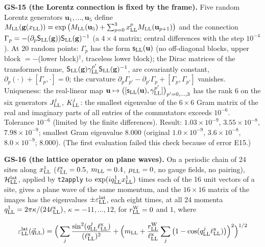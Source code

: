 \documentclass[
  10pt,
]{article}
\begin{document}
\textbf{GS-15 (the Lorentz connection is fixed by the frame).} Five
random Lorentz generators \(\mathbf u_1,\dots,\mathbf u_5\) define
\(M_{\rm LL}(\mathbf g(x_{\rm LL}))=\exp\big(M_{\rm LL}(\mathbf u_5)+\sum_{p=0}^3x^p_{\rm LL}M_{\rm LL}(\mathbf u_{p+1})\big)\)
and the connection
\(\Gamma_p=-(\partial_p\mathsf S_{\rm LL}(\mathbf g))\mathsf S_{\rm LL}(\mathbf g)^{-1}\)
(a \(4\times4\) matrix; central differences with the step \(10^{-4}\)).
At 20 random points: \(\Gamma_p\) has the form
\(\mathsf s_{\rm LL}(\mathbf u)\) (no off-diagonal blocks, upper block
\(=-\)(lower block)\(^\dagger\), traceless lower block); the Dirac
matrices of the transformed frame,
\(\mathsf S_{\rm LL}(\mathbf g)\gamma^{p'}_{\rm LL}\mathsf S_{\rm LL}(\mathbf g)^{-1}\),
are covariantly constant, \(\partial_p(\cdot)+[\Gamma_p,\cdot]=0\); the
curvature
\(\partial_p\Gamma_{p'}-\partial_{p'}\Gamma_p+[\Gamma_p,\Gamma_{p'}]\)
vanishes. Uniqueness: the real-linear map
\(\mathbf u\mapsto\big([\mathsf s_{\rm LL}(\mathbf u),\gamma^{p'}_{\rm LL}]\big)_{p'=0,\dots,3}\)
has the rank 6 on the six generators \(J^j_{\rm LL}\), \(K^j_{\rm LL}\):
the smallest eigenvalue of the \(6\times6\) Gram matrix of the real and
imaginary parts of all entries of the commutators exceeds \(10^{-6}\).
Tolerance \(10^{-6}\) (limited by the finite differences). Result:
\(1.03\times10^{-9}\), \(3.55\times10^{-8}\), \(7.98\times10^{-9}\);
smallest Gram eigenvalue 8.000 (original \(1.0\times10^{-9}\),
\(3.6\times10^{-8}\), \(8.0\times10^{-9}\); 8.000). (The first
evaluation failed this check because of error E15.)

\textbf{GS-16 (the lattice operator on plane waves).} On a periodic
chain of 24 sites along \(x^1_{\rm LL}\) (\(\ell^{\rm x}_{\rm LL}=0.5\),
\(m_{\rm LL}=0.4\), \(\mu_{\rm LL}=0\), no gauge fields, no pairing),
\(\mathcal H^{\rm lat}_{\rm LL}\), applied by \texttt{t2apply} to
\(\exp(iq^1_{\rm LL}x^1_{\rm LL})\) times each of the 16 unit vectors of
a site, gives a plane wave of the same momentum, and the \(16\times16\)
matrix of the images has the eigenvalues
\(\pm\varepsilon^{\rm lat}_{\rm LL}\), each eight times, at all 24
momenta \(q^1_{\rm LL}=2\pi\kappa/(24\ell^{\rm x}_{\rm LL})\),
\(\kappa=-11,\dots,12\), for \(r^{\rm W}_{\rm LL}=0\) and \(1\), where

\[\varepsilon^{\rm lat}_{\rm LL}(\vec q_{\rm LL})=\Big(\sum_j\frac{\sin^2(q^j_{\rm LL}\ell^{\rm x}_{\rm LL})}{(\ell^{\rm x}_{\rm LL})^2}+\Big(m_{\rm LL}+\frac{r^{\rm W}_{\rm LL}}{\ell^{\rm x}_{\rm LL}}\sum_j\big(1-\cos(q^j_{\rm LL}\ell^{\rm x}_{\rm LL})\big)\Big)^2\Big)^{1/2}\]
\end{document}
